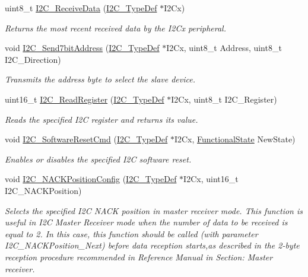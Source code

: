 \begin{DoxyCompactItemize}
uint8\+\_\+t \hyperlink{group___i2_c___exported___functions_gaeaaa4b6f77f50eb57465148c55d27fb2}{I2\+C\+\_\+\+Receive\+Data} (\hyperlink{struct_i2_c___type_def}{I2\+C\+\_\+\+Type\+Def} $\ast$I2\+Cx)
\begin{DoxyCompactList}\small\item\em Returns the most recent received data by the I2\+Cx peripheral. \end{DoxyCompactList}\item 
void \hyperlink{group___i2_c___exported___functions_ga009fc2a5b2313c36da39ece39a1156a6}{I2\+C\+\_\+\+Send7bit\+Address} (\hyperlink{struct_i2_c___type_def}{I2\+C\+\_\+\+Type\+Def} $\ast$I2\+Cx, uint8\+\_\+t Address, uint8\+\_\+t I2\+C\+\_\+\+Direction)
\begin{DoxyCompactList}\small\item\em Transmits the address byte to select the slave device. \end{DoxyCompactList}\item 
uint16\+\_\+t \hyperlink{group___i2_c___exported___functions_ga8021dc796d15f997356b0583d6346805}{I2\+C\+\_\+\+Read\+Register} (\hyperlink{struct_i2_c___type_def}{I2\+C\+\_\+\+Type\+Def} $\ast$I2\+Cx, uint8\+\_\+t I2\+C\+\_\+\+Register)
\begin{DoxyCompactList}\small\item\em Reads the specified I2C register and returns its value. \end{DoxyCompactList}\item 
void \hyperlink{group___i2_c___exported___functions_ga1289c908aeb882443aba323b459c638b}{I2\+C\+\_\+\+Software\+Reset\+Cmd} (\hyperlink{struct_i2_c___type_def}{I2\+C\+\_\+\+Type\+Def} $\ast$I2\+Cx, \hyperlink{group___exported__types_gac9a7e9a35d2513ec15c3b537aaa4fba1}{Functional\+State} New\+State)
\begin{DoxyCompactList}\small\item\em Enables or disables the specified I2C software reset. \end{DoxyCompactList}\item 
void \hyperlink{group___i2_c___exported___functions_gad08ebffc3a234d84e6405ec115bd74f1}{I2\+C\+\_\+\+N\+A\+C\+K\+Position\+Config} (\hyperlink{struct_i2_c___type_def}{I2\+C\+\_\+\+Type\+Def} $\ast$I2\+Cx, uint16\+\_\+t I2\+C\+\_\+\+N\+A\+C\+K\+Position)
\begin{DoxyCompactList}\small\item\em Selects the specified I2C N\+A\+CK position in master receiver mode. This function is useful in I2C Master Receiver mode when the number of data to be received is equal to 2. In this case, this function should be called (with parameter I2\+C\+\_\+\+N\+A\+C\+K\+Position\+\_\+\+Next) before data reception starts,as described in the 2-\/byte reception procedure recommended in Reference Manual in Section\+: Master receiver. \end{DoxyCompactList}\item 

\end{DoxyCompactItemize}
